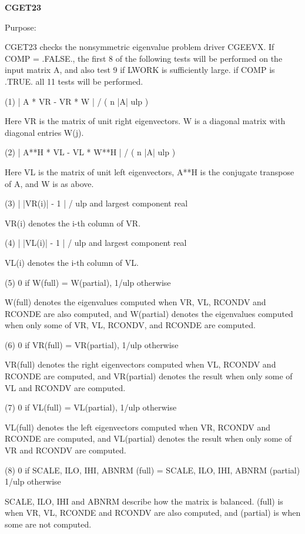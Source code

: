 {\bfseries C\+G\+E\+T23} 

\begin{DoxyParagraph}{Purpose\+: }
\begin{DoxyVerb}    CGET23  checks the nonsymmetric eigenvalue problem driver CGEEVX.
    If COMP = .FALSE., the first 8 of the following tests will be
    performed on the input matrix A, and also test 9 if LWORK is
    sufficiently large.
    if COMP is .TRUE. all 11 tests will be performed.

    (1)     | A * VR - VR * W | / ( n |A| ulp )

      Here VR is the matrix of unit right eigenvectors.
      W is a diagonal matrix with diagonal entries W(j).

    (2)     | A**H * VL - VL * W**H | / ( n |A| ulp )

      Here VL is the matrix of unit left eigenvectors, A**H is the
      conjugate transpose of A, and W is as above.

    (3)     | |VR(i)| - 1 | / ulp and largest component real

      VR(i) denotes the i-th column of VR.

    (4)     | |VL(i)| - 1 | / ulp and largest component real

      VL(i) denotes the i-th column of VL.

    (5)     0 if W(full) = W(partial), 1/ulp otherwise

      W(full) denotes the eigenvalues computed when VR, VL, RCONDV
      and RCONDE are also computed, and W(partial) denotes the
      eigenvalues computed when only some of VR, VL, RCONDV, and
      RCONDE are computed.

    (6)     0 if VR(full) = VR(partial), 1/ulp otherwise

      VR(full) denotes the right eigenvectors computed when VL, RCONDV
      and RCONDE are computed, and VR(partial) denotes the result
      when only some of VL and RCONDV are computed.

    (7)     0 if VL(full) = VL(partial), 1/ulp otherwise

      VL(full) denotes the left eigenvectors computed when VR, RCONDV
      and RCONDE are computed, and VL(partial) denotes the result
      when only some of VR and RCONDV are computed.

    (8)     0 if SCALE, ILO, IHI, ABNRM (full) =
                 SCALE, ILO, IHI, ABNRM (partial)
            1/ulp otherwise

      SCALE, ILO, IHI and ABNRM describe how the matrix is balanced.
      (full) is when VR, VL, RCONDE and RCONDV are also computed, and
      (partial) is when some are not computed.


\end{DoxyVerb}
\end{DoxyParagraph}
